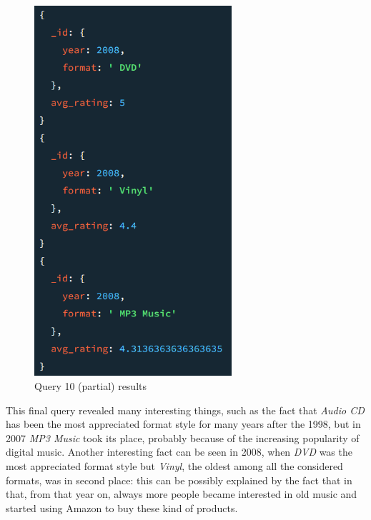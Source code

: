 \begin{figure}[H]
\begin{minipage}{0.45\textwidth}
      \includegraphics[width=0.65\textwidth]{Images/q10_result_2.png}
  \end{minipage}
  \caption{Query 10 (partial) results}
\end{figure}
This final query revealed many interesting things, such as the fact that \textit{Audio CD} has been the most appreciated format style for many years after the 1998, but in 2007 \textit{MP3 Music} took its place, probably because of the increasing popularity of digital music.
Another interesting fact can be seen in 2008, when \textit{DVD} was the most appreciated format style but \textit{Vinyl}, the oldest among all the considered formats, was in second place: this can be possibly explained by the fact that in that, from that year on, always more people became interested in old music and started using Amazon to buy these kind of products. \\
